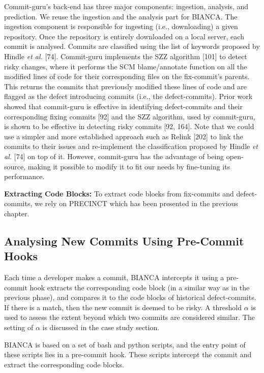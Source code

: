 \documentclass[12pt]{report}
\begin{document}
Commit-guru's back-end has three major components: ingestion, analysis,
and prediction. We reuse the ingestion and the analysis part for BIANCA.
The ingestion component is responsible for ingesting (i.e., downloading)
a given repository. Once the repository is entirely downloaded on a
local server, each commit is analysed. Commits are classified using the
list of keywords proposed by Hindle \emph{et al.} {[}74{]}. Commit-guru
implements the SZZ algorithm {[}101{]} to detect risky changes, where it
performs the SCM blame/annotate function on all the modified lines of
code for their corresponding files on the fix-commit's parents. This
returns the commits that previously modified these lines of code and are
flagged as the defect introducing commits (i.e., the defect-commits).
Prior work showed that commit-guru is effective in identifying
defect-commits and their corresponding fixing commits {[}92{]} and the
SZZ algorithm, used by commit-guru, is shown to be effective in
detecting risky commits {[}92, 164{]}. Note that we could use a simpler
and more established approach such as Relink {[}202{]} to link the
commits to their issues and re-implement the classification proposed by
Hindle \emph{et al.} {[}74{]} on top of it. However, commit-guru has the
advantage of being open-source, making it possible to modify it to fit
our needs by fine-tuning its performance.

\textbf{Extracting Code Blocks:} To extract code blocks from fix-commits
and defect-commits, we rely on PRECINCT which has been presented in the
previous chapter.

\subsection{Analysing New Commits Using Pre-Commit
Hooks}\label{sec:online}

Each time a developer makes a commit, BIANCA intercepts it using a
pre-commit hook extracts the corresponding code block (in a similar way
as in the previous phase), and compares it to the code blocks of
historical defect-commits. If there is a match, then the new commit is
deemed to be risky. A threshold \(\alpha\) is used to assess the extent
beyond which two commits are considered similar. The setting of
\(\alpha\) is discussed in the case study section.

BIANCA is based on a set of bash and python scripts, and the entry point
of these scripts lies in a pre-commit hook. These scripts intercept the
commit and extract the corresponding code blocks.
\end{document}

